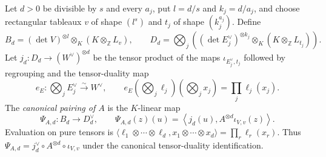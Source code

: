 \begin{definition}
\label{def:canonical-pairing}
\leanok
Let $d>0$ be divisible by $s$ and every $a_j$, put $l=d/s$ and $k_j=d/a_j$,
and choose rectangular tableaux $v$ of shape $(l^s)$ and $t_j$ of shape
$(k_j^{a_j})$. Define
\[
 B_d=(\det V)^{\otimes l}\otimes_K(K\otimes_{\mathbb Z}L_v),
 \qquad
 D_d=\bigotimes_j\left((\det E_j^\vee)^{\otimes k_j}
              \otimes_K(K\otimes_{\mathbb Z}L_{t_j})\right).
\]
Let $j_d:D_d\to(W^\vee)^{\otimes d}$ be the tensor product of the maps
$\iota_{E_j^\vee,t_j}$ followed by regrouping and the tensor-duality map
\[
 e_E:\bigotimes_j E_j^\vee\xrightarrow{\sim}W^\vee,
 \qquad e_E(\bigotimes_j\ell_j)(\bigotimes_jx_j)=\prod_j\ell_j(x_j).
\]
The \emph{canonical pairing of $A$} is the $K$-linear map
\[
 \Psi_{A,d}:B_d\longrightarrow D_d^\vee,\qquad
 \Psi_{A,d}(z)(u)=
 \left\langle j_d(u),A^{\otimes d}\iota_{V,v}(z)\right\rangle.
\]
Evaluation on pure tensors is
$\langle\ell_1\otimes\cdots\otimes\ell_d,
 x_1\otimes\cdots\otimes x_d\rangle=\prod_r\ell_r(x_r)$.
Thus $\Psi_{A,d}=j_d^\vee\circ A^{\otimes d}\circ\iota_{V,v}$ under the
canonical tensor-duality identification.
\end{definition}

